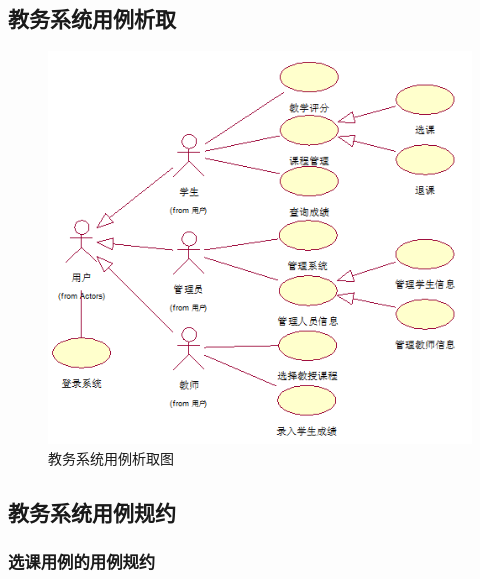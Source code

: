 \subsection{教务系统用例析取}
\begin{figure}[H]
   \centering \includegraphics[width=\textwidth]{img/jwxt_usecases.png}
   \caption{教务系统用例析取图}
\end{figure}

\subsection{教务系统用例规约}
\subsubsection{选课用例的用例规约}

